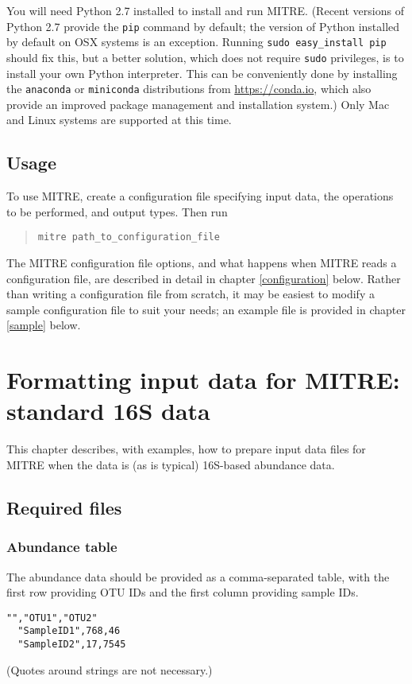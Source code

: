\documentclass[12pt]{report}
\begin{document}
You will need Python 2.7 installed to install and run MITRE. (Recent
versions of Python 2.7 provide the \texttt{pip} command by default;
the version of Python installed by default on OSX systems is an
exception. Running \texttt{sudo easy\_install pip} should fix this,
but a better solution, which does not require \texttt{sudo}
privileges, is to install your own Python interpreter. This can be
conveniently done by installing the \texttt{anaconda} or
\texttt{miniconda} distributions from \url{https://conda.io}, which
also provide an improved package management and installation system.)
Only Mac and Linux systems are supported at this time.

\section{Usage}
To use MITRE, create a configuration file specifying input data, the
operations to be performed, and output types. Then run \begin{quote} \texttt{mitre
  path\_to\_configuration\_file} \end{quote} The MITRE configuration file
options, and what happens when MITRE reads a configuration file, are
described in detail in chapter \ref{configuration} below. Rather than
writing a configuration file from scratch, it may be easiest to modify
a sample configuration file to suit your needs; an example file is
provided in chapter \ref{sample} below.


\chapter{Formatting input data for MITRE: standard 16S data}
This chapter describes, with examples, how to prepare input data files
for MITRE when the data is (as is typical) 16S-based abundance data.


\section{Required files}
\subsection{Abundance table}\label{abundance_data}
The abundance data should be provided as a comma-separated table,
with the first row providing OTU IDs and the first column providing
sample IDs. 
\begin{lstlisting}[caption=Example abundance data table]
  "","OTU1","OTU2"
  "SampleID1",768,46
  "SampleID2",17,7545
\end{lstlisting}
(Quotes around strings are not necessary.)
\end{document}
